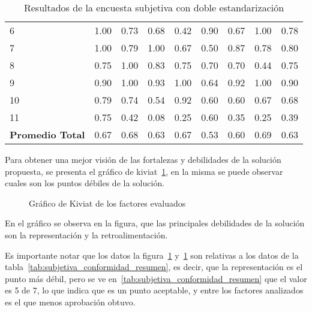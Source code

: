 \begin{table}[!hbt]
\begin{tabular}{lrrrrrrrr}
6              & 1.00 & 0.73 & 0.68 & 0.42 & 0.90 & 0.67 & 1.00 & 0.78 \\
7              & 1.00 & 0.79 & 1.00 & 0.67 & 0.50 & 0.87 & 0.78 & 0.80 \\
8              & 0.75 & 1.00 & 0.83 & 0.75 & 0.70 & 0.70 & 0.44 & 0.75 \\
9              & 0.90 & 1.00 & 0.93 & 1.00 & 0.64 & 0.92 & 1.00 & 0.90 \\
10             & 0.79 & 0.74 & 0.54 & 0.92 & 0.60 & 0.60 & 0.67 & 0.68 \\
11             & 0.75 & 0.42 & 0.08 & 0.25 & 0.60 & 0.35 & 0.25 & 0.39 \\
\midrule
\textbf{Promedio Total} & 0.67 & 0.68 & 0.63 & 0.67 & 0.53 & 0.60 & 0.69 & 0.63 \\
\bottomrule
\end{tabular}
\caption{Resultados de la encuesta subjetiva con doble estandarización}
\label{tab:subjetiva_conformidad_corregida}
\end{table}

Para obtener una mejor visión de las fortalezas y debilidades de la solución
propuesta, se presenta el gráfico de kiviat~\ref{fig:subjetiva_kiviat}, en la
misma se puede observar cuales son los puntos débiles de la solución.

\begin{figure}[!ht]
\label{fig:subjetiva_kiviat}
\caption{Gráfico de Kiviat de los factores evaluados}
\end{figure}

En el gráfico se observa en la figura, que las principales debilidades de
la solución son la representación y la retroalimentación.

Es importante notar que los datos la figura~\ref{fig:subjetiva_kiviat}
y~\ref{tab:subjetiva_conformidad_corregida} son relativas a los datos de la
tabla~\ref{tab:subjetiva_conformidad_resumen}, es decir, que la representación
es el punto más débil, pero se ve en~\ref{tab:subjetiva_conformidad_resumen}
que el valor es 5 de 7, lo que indica que es un punto aceptable, y entre
los factores analizados es el que menos aprobación obtuvo.

